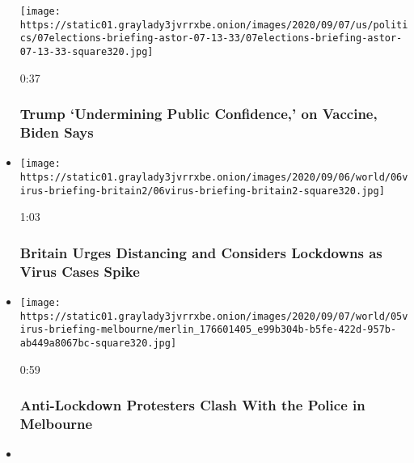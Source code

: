 \begin{itemize}
  \texttt{[image: https://static01.graylady3jvrrxbe.onion/images/2020/09/07/us/politics/07elections-briefing-astor-07-13-33/07elections-briefing-astor-07-13-33-square320.jpg]}

  0:37

  \hypertarget{trump-undermining-public-confidence-on-vaccine-biden-says}{%
  \subsubsection{Trump `Undermining Public Confidence,' on Vaccine,
  Biden
  Says}\label{trump-undermining-public-confidence-on-vaccine-biden-says}}
\item
  \href{https://www.nytimes3xbfgragh.onion/video/world/europe/100000007328066/britain-coronavirus-cases.html?action=click\&module=video-series-bar\&region=header\&pgtype=Article\&playlistId=video/coronavirus-news-update}{}

  \texttt{[image: https://static01.graylady3jvrrxbe.onion/images/2020/09/06/world/06virus-briefing-britain2/06virus-briefing-britain2-square320.jpg]}

  1:03

  \hypertarget{britain-urges-distancing-and-considers-lockdowns-as-virus-cases-spike}{%
  \subsubsection{Britain Urges Distancing and Considers Lockdowns as
  Virus Cases
  Spike}\label{britain-urges-distancing-and-considers-lockdowns-as-virus-cases-spike}}
\item
  \href{https://www.nytimes3xbfgragh.onion/video/world/australia/100000007326477/melbourne-coronavirus-protest.html?action=click\&module=video-series-bar\&region=header\&pgtype=Article\&playlistId=video/coronavirus-news-update}{}

  \texttt{[image: https://static01.graylady3jvrrxbe.onion/images/2020/09/07/world/05virus-briefing-melbourne/merlin\_176601405\_e99b304b-b5fe-422d-957b-ab449a8067bc-square320.jpg]}

  0:59

  \hypertarget{anti-lockdown-protesters-clash-with-the-police-in-melbourne}{%
  \subsubsection{Anti-Lockdown Protesters Clash With the Police in
  Melbourne}\label{anti-lockdown-protesters-clash-with-the-police-in-melbourne}}
\item
  \href{https://www.nytimes3xbfgragh.onion/video/us/politics/100000007325803/new-jersey-governor-indoor-dining-smoking.html?action=click\&module=video-series-bar\&region=header\&pgtype=Article\&playlistId=video/coronavirus-news-update}{}


\end{itemize}
